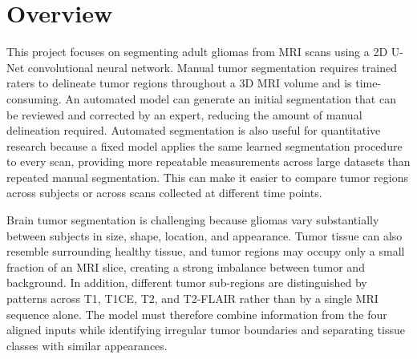 
\section{Overview}

This project focuses on segmenting adult gliomas from MRI scans using a 2D
U-Net convolutional neural network. Manual tumor segmentation requires trained raters to delineate tumor regions
throughout a 3D MRI volume and is time-consuming. An automated model
can generate an initial segmentation that can be reviewed and corrected by an
expert, reducing the amount of manual delineation required. Automated
segmentation is also useful for quantitative research because a fixed model
applies the same learned segmentation procedure to every scan, providing more
repeatable measurements across large datasets than repeated manual
segmentation. This can make it easier to compare tumor regions across subjects
or across scans collected at different time points.

Brain tumor segmentation is challenging because gliomas vary substantially
between subjects in size, shape, location, and appearance. Tumor tissue can
also resemble surrounding healthy tissue, and tumor regions may occupy only a
small fraction of an MRI slice, creating a strong imbalance between tumor and
background. In addition, different tumor sub-regions are distinguished by
patterns across T1, T1CE, T2, and T2-FLAIR rather than by a single MRI sequence
alone. The model must therefore combine information from the four aligned
inputs while identifying irregular tumor boundaries and separating tissue
classes with similar appearances.
